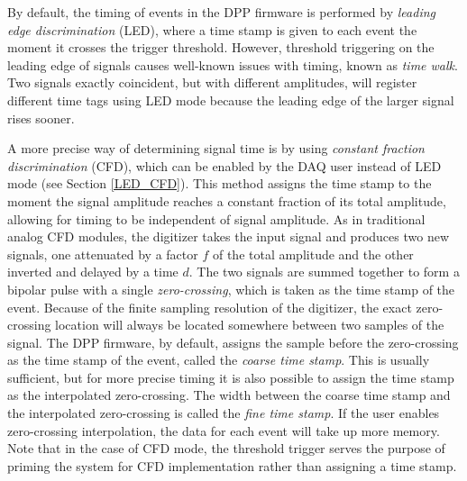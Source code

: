 
By default, the timing of events in the DPP firmware is performed by \textit{leading edge discrimination} (LED), where a time stamp is given to each event the moment it crosses the trigger threshold. However, threshold triggering on the leading edge of signals causes well-known issues with timing, known as \textit{time walk}. Two signals exactly coincident, but with different amplitudes, will register different time tags using LED mode because the leading edge of the larger signal rises sooner. 


A more precise way of determining signal time is by using \textit{constant fraction discrimination} (CFD), which can be enabled by the DAQ user instead of LED mode (see Section \ref{LED_CFD}). This method assigns the time stamp to the moment the signal amplitude reaches a constant fraction of its total amplitude, allowing for timing to be independent of signal amplitude. As in traditional analog CFD modules, the digitizer takes the input signal and produces two new signals, one attenuated by a factor $f$ of the total amplitude and the other inverted and delayed by a time $d$. The two signals are summed together to form a bipolar pulse with a single \textit{zero-crossing}, which is taken as the time stamp of the event. Because of the finite sampling resolution of the digitizer, the exact zero-crossing location will always be located somewhere between two samples of the signal. The DPP firmware, by default, assigns the sample before the zero-crossing as the time stamp of the event, called the \textit{coarse time stamp}. This is usually sufficient, but for more precise timing it is also possible to assign the time stamp as the interpolated zero-crossing. The width between the coarse time stamp and the interpolated zero-crossing is called the \textit{fine time stamp}. If the user enables zero-crossing interpolation, the data for each event will take up more memory. Note that in the case of CFD mode, the threshold trigger serves the purpose of priming the system for CFD implementation rather than assigning a time stamp.

